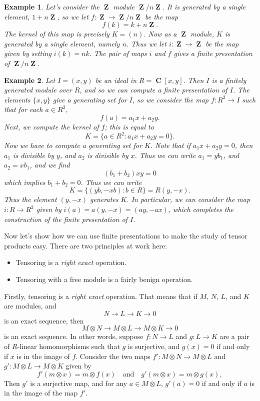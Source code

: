 \documentclass{article}
\theoremstyle{plain}
\newtheorem*{example}{Example}
\theoremstyle{remark}
\theoremstyle{definition}
\DeclareMathOperator{\ZZ}{\mathbf{Z}}
\DeclareMathOperator{\CC}{\mathbf{C}}
\begin{document}
\begin{example}
	Let's consider the $\ZZ$ module $\ZZ/n \ZZ$. It is generated by a single element, $1 + n \ZZ$, so we let $f: \ZZ \to \ZZ / n \ZZ$ be the map
	\[ f(k) = k + n \ZZ. \]
	The kernel of this map is precisely $K = (n)$. Now as a $\ZZ$ module, $K$ is generated by a single element, namely $n$. Thus we let $i: \ZZ \to \ZZ$ be the map given by setting $i(k) = nk$. The pair of maps $i$ and $f$ gives a finite presentation of $\ZZ / n \ZZ$.
\end{example}

\begin{example}
	Let $I = (x,y)$ be an ideal in $R = \CC[x,y]$. Then $I$ is a finitely generated module over $R$, and so we can compute a finite presentation of $I$. The elements $\{ x,y \}$ give a generating set for $I$, so we consider the map $f: R^2 \to I$ such that for each $a \in R^2$,
	\[ f(a) = a_1x + a_2y. \]
	Next, we compute the kernel of $f$; this is equal to
	\[ K = \{ a \in R^2 : a_1x + a_2y = 0 \}. \]
	Now we have to compute a generating set for $K$. Note that if $a_1x + a_2y = 0$, then $a_1$ is divisible by $y$, and $a_2$ is divisible by $x$. Thus we can write $a_1 = y b_1$, and $a_2 = x b_1$, and we find
	\[ (b_1 + b_2) xy = 0 \]
	which implies $b_1 + b_2 = 0$. Thus we can write
	\[ K = \{ (yb, -xb): b \in R \} = R (y,-x). \]
	Thus the element $(y,-x)$ generates $K$. In particular, we can consider the map $i: R \to R^2$ given by $i(a) = a(y,-x) = (ay,-ax)$, which completes the construction of the finite presentation of $I$.
\end{example}

Now let's show how we can use finite presentations to make the study of tensor products easy. There are two principles at work here:
%
\begin{itemize}
	\item Tensoring is a \emph{right exact} operation.
	\item Tensoring with a free module is a fairly benign operation.
\end{itemize}
%
Firstly, tensoring is a \emph{right exact} operation. That means that if $M$, $N$, $L$, and $K$ are modules, and
%
\[ N \to L \to K \to 0 \]
%
is an exact sequence, then
%
\[ M \otimes N \to M \otimes L \to M \otimes K \to 0 \]
%
is an exact sequence. In other words, suppose $f: N \to L$ and $g: L \to K$ are a pair of $R$-linear homomorphisms such that $g$ is surjective, and $g(x) = 0$ if and only if $x$ is in the image of $f$. Consider the two maps $f': M \otimes N \to M \otimes L$ and $g': M \otimes L \to M \otimes K$ given by
%
\[ f'(m \otimes x) = m \otimes f(x) \quad\text{and}\quad g'(m \otimes x) = m \otimes g(x), \]
%
Then $g'$ is a surjective map, and for any $a \in M \otimes L$, $g'(a) = 0$ if and only if $a$ is in the image of the map $f'$.
\end{document}
